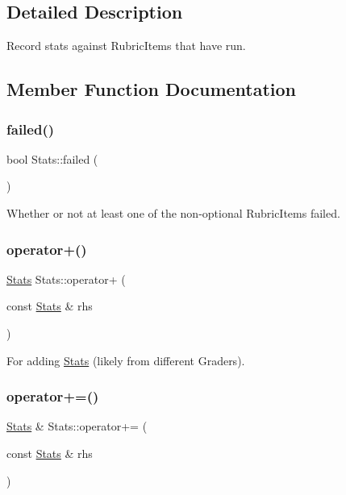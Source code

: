 \subsection{Detailed Description}
Record stats against Rubric\+Items that have run. 

\subsection{Member Function Documentation}
\hypertarget{class_stats_afa92b4d8fa48ee7cd6e349ae6a5bf539}{}\label{class_stats_afa92b4d8fa48ee7cd6e349ae6a5bf539} 
\subsubsection{\texorpdfstring{failed()}{failed()}}
{\footnotesize\ttfamily bool Stats\+::failed (\begin{DoxyParamCaption}{ }\end{DoxyParamCaption})}

Whether or not at least one of the non-\/optional Rubric\+Items failed. \hypertarget{class_stats_a32ab6b479ad79fe923e2264e09080806}{}\label{class_stats_a32ab6b479ad79fe923e2264e09080806} 
\subsubsection{\texorpdfstring{operator+()}{operator+()}}
{\footnotesize\ttfamily \hyperlink{class_stats}{Stats} Stats\+::operator+ (\begin{DoxyParamCaption}\item[{const \hyperlink{class_stats}{Stats} \&}]{rhs }\end{DoxyParamCaption})}

For adding \hyperlink{class_stats}{Stats} (likely from different Graders). \hypertarget{class_stats_a40fa54dfb9b36d73bd77c5db4b294a79}{}\label{class_stats_a40fa54dfb9b36d73bd77c5db4b294a79} 
\subsubsection{\texorpdfstring{operator+=()}{operator+=()}}
{\footnotesize\ttfamily \hyperlink{class_stats}{Stats} \& Stats\+::operator+= (\begin{DoxyParamCaption}\item[{const \hyperlink{class_stats}{Stats} \&}]{rhs }\end{DoxyParamCaption})}


